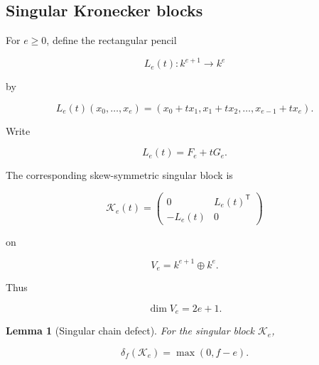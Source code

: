 \documentclass[11pt]{article}
\newtheorem{lemma}[theorem]{Lemma}
\begin{document}
\subsection{Singular Kronecker blocks}

For $e\ge0$, define the rectangular pencil

\[
L_e(t):k^{e+1}\to k^e
\]

by

\[
L_e(t)(x_0,\ldots,x_e)
=
(x_0+t x_1,
x_1+t x_2,
\ldots,
x_{e-1}+t x_e).
\]

Write

\[
L_e(t)=F_e+tG_e.
\]

The corresponding skew-symmetric singular block is

\[
\mathcal K_e(t)
=
\begin{pmatrix}
0&L_e(t)^{\mathsf T}\\
-L_e(t)&0
\end{pmatrix}
\]

on

\[
V_e=k^{e+1}\oplus k^e.
\]

Thus

\[
\dim V_e=2e+1.
\]

\begin{lemma}[Singular chain defect]

For the singular block $\mathcal K_e$,

\[
\boxed{
\delta_f(\mathcal K_e)=\max(0,f-e).
}
\]

\end{lemma}
\end{document}
